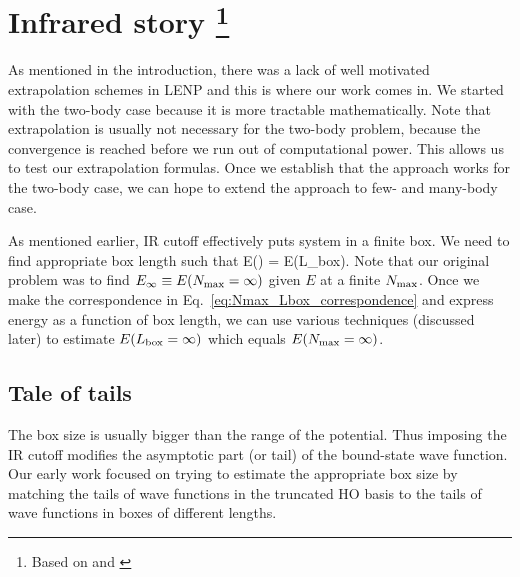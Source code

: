 	\section[Infrared story]{Infrared story
	\footnote{Based on \cite{More:2013rma} and \cite{Furnstahl:2013vda}}}

	As mentioned in the introduction, there was a lack of well motivated
	extrapolation schemes in LENP and this is where our work comes in.
	We started with the two-body case because it is more tractable
	mathematically.  Note that extrapolation is usually not necessary for the
	two-body problem, because the convergence is reached before we run out of
	computational power.  This allows us to test our extrapolation formulas.
	Once we establish that the approach works for the two-body case, we can hope
	to extend the approach to few- and many-body case.

	As mentioned earlier, IR cutoff effectively puts system in a finite box.
	We need to find appropriate box length such that
	\beq
	E(\Nmax) = E(L_{\rm box})\;.
	\label{eq:Nmax_Lbox_correspondence}
	\eeq
	Note that our original problem was to find $E_{\infty} \equiv E({N_{\mathrm{max}}} = \infty)$
	given $E$ at a finite ${N_{\mathrm{max}}}$.  Once we make the correspondence in
	Eq.~\eqref{eq:Nmax_Lbox_correspondence} and express energy as a function of
	box length, we can use various techniques (discussed later) to estimate
	$E (L_{\rm box} = \infty)$ which equals $E({N_{\mathrm{max}}} = \infty)$.

	\subsection{Tale of tails}
	\label{subsec:tale_of_tails}

	The box size is usually bigger than the range of the potential.  Thus
	imposing the IR cutoff modifies the asymptotic part (or tail) of the
	bound-state wave function.  Our early work focused on trying to estimate the
	appropriate box size by matching the tails of wave functions in the truncated
	HO basis to the tails of wave functions in boxes of different lengths.

